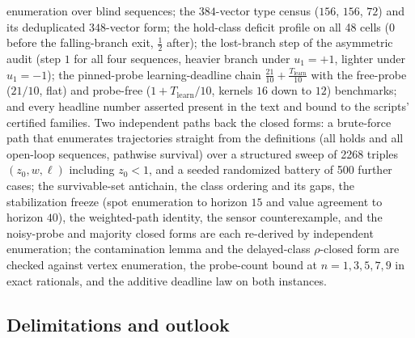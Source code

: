 \documentclass[10pt,twocolumn]{article}
\theoremstyle{plain}
\theoremstyle{definition}
\theoremstyle{remark}
\begin{document}
enumeration over blind sequences; the \(384\)-vector type census
(\(156\), \(156\), \(72\)) and its deduplicated \(348\)-vector
form; the hold-class deficit profile on all 48 cells (\(0\) before the
falling-branch exit, \(\tfrac{1}{2}\) after); the lost-branch step of
the asymmetric audit (step \(1\) for all four sequences, heavier
branch under \(u_{1} = +1\), lighter under \(u_{1} = -1\)); the
pinned-probe learning-deadline chain
\(\tfrac{21}{10} + \tfrac{T_{\mathrm{learn}}}{10}\) with the
free-probe (\(21/10\), flat) and probe-free
(\(1 + T_{\mathrm{learn}}/10\), kernels \(16\) down to \(12\))
benchmarks; and every headline
number asserted present in the text and bound to the scripts' certified families. Two independent paths back the closed forms: a
brute-force path that enumerates trajectories straight from the
definitions (all holds and all open-loop sequences, pathwise survival)
over a structured sweep of 2268 triples
\((z_{0}, w, \ell)\) including \(z_{0} < 1\), and a seeded
randomized battery of 500 further cases; the survivable-set antichain,
the class ordering and its gaps, the stabilization freeze (spot
enumeration to horizon \(15\) and value agreement to horizon
\(40\)), the weighted-path identity, the sensor counterexample, and
the noisy-probe and majority closed forms are each re-derived by
independent enumeration; the contamination lemma and the delayed-class
\(\rho\)-closed form are checked against vertex enumeration, the
probe-count bound at \(n = 1, 3, 5, 7, 9\) in exact rationals, and the
additive deadline law on both instances.

\subsection{Delimitations and outlook}\label{scope}
\end{document}
